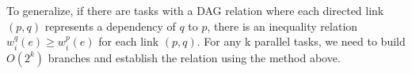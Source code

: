 To generalize, if there are tasks with a DAG relation where each directed link $(p,q)$ represents a dependency of $q$ to $p$, there is an inequality relation $w_i^q(e) \geq w_i^p(e)$ for each link $(p,q)$. For any k parallel tasks, we need to build $O(2^k)$ branches and establish the relation using the method above.   
